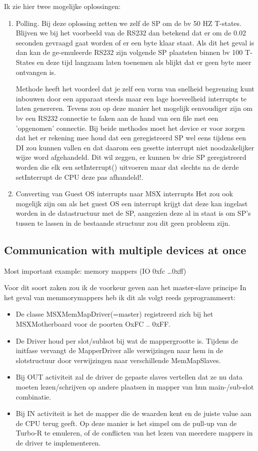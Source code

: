 \documentclass[11pt, a4paper]{report}
\begin{document}
Ik zie hier twee mogelijke oplossingen:
\label{unpredic-irq}
\begin{enumerate}
\item Polling.
Bij deze oplossing zetten we zelf de SP om de bv 50 HZ T-states.
Blijven we bij het voorbeeld van de RS232 dan betekend dat er om de 0.02 seconden 
gevraagd gaat worden of er een byte klaar staat. Als dit het geval is dan kan de 
ge-emuleerde RS232 zijn volgende SP plaatsten binnen bv 100 T-States en deze tijd 
langzaam laten toenemen als blijkt dat er geen byte meer ontvangen is.

Methode heeft het voordeel dat je zelf een vorm van snelheid begrenzing kunt
inbouwen door een apparaat steeds maar een lage hoeveelheid interrupts te laten
genereren. Tevens zou op deze manier het mogelijk eenvoudiger zijn om bv een
RS232 connectie te faken aan de hand van een file met een 'opgenomen' connectie.
Bij beide methodes moet het device er voor zorgen dat het er rekening mee houd
dat een geregistreerd SP wel eens tijdens een DI zou kunnen vallen en dat daarom
een gesette interrupt niet noodzakelijker wijze word afgehandeld. Dit wil
zeggen, er kunnen bv drie SP geregistreerd worden die elk een setInterrupt()
uitvoeren maar dat slechts na de derde setInterrupt de CPU deze pas afhandeld!.

\item Converting van Guest OS interrupts naar MSX interrupts
Het zou ook mogelijk zijn om als het guest OS een interrupt krijgt dat deze kan 
ingelast worden in de datastructuur met de SP, aangezien deze al in staat is om 
SP's tussen te lassen in de bestaande structuur zou dit geen probleem zijn.
\end{enumerate}


\subsection{Communication with multiple devices at once}

Most important example: memory mappers (IO 0xfc \ldots 0xff)

Voor dit soort zaken zou ik de voorkeur geven aan het master-slave principe
In het geval van memmorymappers heb ik dit als volgt reeds geprogrammeert:
\begin{itemize}
\item De classe MSXMemMapDriver(=master) registreerd zich bij het MSXMotherboard voor de 
poorten OxFC .. 0xFF.
\item De Driver houd per slot/sublsot bij wat de mappergrootte is. Tijdens de initfase
vervangt de MapperDriver alle verwijzingen naar hem in de slotstructuur door verwijzingen 
naar verschillende MemMapSlaves.
\item Bij OUT activiteit zal de driver de gepaste slaves vertellen dat ze nu data moeten 
lezen/schrijven op andere plaatsen in mapper van hun main-/sub-slot combinatie.
\item Bij IN activiteit is het de mapper die de waarden kent en de juiste value aan de
CPU terug geeft. Op deze manier is het simpel om de pull-up van de Turbo-R te
emuleren, of de conflicten van het lezen van meerdere mappers in de driver te 
implementeren.
\end{itemize}
\end{document}
